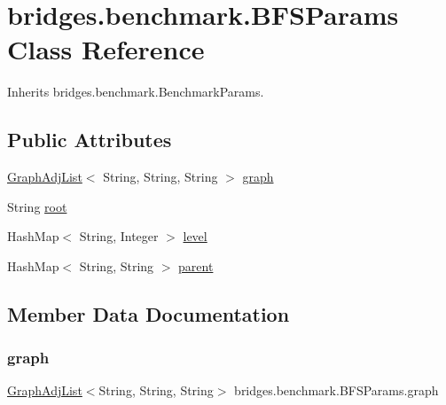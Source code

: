 \hypertarget{classbridges_1_1benchmark_1_1_b_f_s_params}{}\section{bridges.\+benchmark.\+B\+F\+S\+Params Class Reference}
\label{classbridges_1_1benchmark_1_1_b_f_s_params}


Inherits bridges.\+benchmark.\+Benchmark\+Params.

\subsection*{Public Attributes}
\begin{DoxyCompactItemize}
\item 
\hyperlink{classbridges_1_1base_1_1_graph_adj_list}{Graph\+Adj\+List}$<$ String, String, String $>$ \hyperlink{classbridges_1_1benchmark_1_1_b_f_s_params_a02dcb89b57adca32f76baae05d443503}{graph}
\item 
String \hyperlink{classbridges_1_1benchmark_1_1_b_f_s_params_afb0381b52b0a8eddb60f420f119e4c99}{root}
\item 
Hash\+Map$<$ String, Integer $>$ \hyperlink{classbridges_1_1benchmark_1_1_b_f_s_params_afb4eff1d30d1f3a25d63d1bf8a4577ad}{level}
\item 
Hash\+Map$<$ String, String $>$ \hyperlink{classbridges_1_1benchmark_1_1_b_f_s_params_a2073895d415e83506c9b538b6d40e101}{parent}
\end{DoxyCompactItemize}


\subsection{Member Data Documentation}
\mbox{\label{classbridges_1_1benchmark_1_1_b_f_s_params_a02dcb89b57adca32f76baae05d443503}} 
\subsubsection{\texorpdfstring{graph}{graph}}
{\footnotesize\ttfamily \hyperlink{classbridges_1_1base_1_1_graph_adj_list}{Graph\+Adj\+List}$<$String, String, String$>$ bridges.\+benchmark.\+B\+F\+S\+Params.\+graph}


